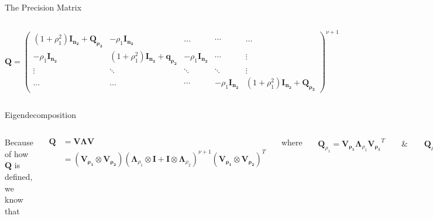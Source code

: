 \documentclass[
  ignorenonframetext,
]{beamer}
\providecommand{\tightlist}{%
  \setlength{\itemsep}{0pt}\setlength{\parskip}{0pt}}\usepackage{longtable,booktabs,array}
\begin{document}
\begin{frame}{The Precision Matrix}
\begin{columns}[T]
\[
\mathbf Q = \begin{pmatrix}
(1+\rho_1^2)\mathbf{I_{n_2}} + \mathbf{Q_{\rho_2}} & -\rho_1\mathbf{I_{n_2}} & \dots & \cdots & \dots \\
-\rho_1\mathbf{I_{n_2}} & (1+\rho_1^2)\mathbf{I_{n_2}} + \mathbf{q_{\rho_2}} & -\rho_1 \mathbf{I_{n_2}} & \cdots & \vdots  \\
\vdots & \ddots & \ddots & \ddots & \vdots \\
\dots & \dots & \cdots & -\rho_1 \mathbf{I_{n_2}} & (1+\rho_1^2)\mathbf{I_{n_2}} + \mathbf{Q_{\rho_2}}
\end{pmatrix}^{\nu + 1}
\]
\end{columns}
\end{frame}

\begin{frame}{Eigendecomposition}
\label{eigendecomposition}
\begin{columns}[T]
Because of how \(\mathbf{Q}\) is defined, we know that

\[
\begin{aligned}
\mathbf{Q} &= \mathbf{V}\boldsymbol{\Lambda}\mathbf{V} \\
&= (\mathbf{V_{\rho_1}} \otimes \mathbf{V_{\rho_2}})(\boldsymbol \Lambda_{\rho_1} \otimes \mathbf{I} + \mathbf{I} \otimes \boldsymbol \Lambda_{\rho_2})^{\nu + 1}(\mathbf{V_{\rho_1}} \otimes \mathbf{V_{\rho_2}})^T
\end{aligned}
\]

where

\[
\begin{aligned}
\mathbf{Q}_{\rho_1} = \mathbf{V_{\rho_1}}\boldsymbol \Lambda_{\rho_1}\mathbf{V_{\rho_1}}^T \qquad \& \qquad
\mathbf{Q}_{\rho_2} = \mathbf{V_{\rho_2}}\boldsymbol \Lambda_{\rho_2}\mathbf{V_{\rho_2}}^T
\end{aligned}
\]

Spectral decomposition defined by value/vector pairs of smaller matrices

\begin{column}{0.5\textwidth}
\[
\left\{\lambda_{\rho_1}\right\}_i + \left\{\lambda_{\rho_2}\right\}_j
\]
\end{column}

\begin{column}{0.48\textwidth}
\[
\left\{\mathbf{v}_{\rho_1}\right\}_i \otimes \left\{\mathbf{v}_{\rho_2}\right\}_j
\]
\end{column}

\begin{itemize}
\tightlist
\item
  Problem:
  \(\boldsymbol \Sigma_{ii} = \left(\mathbf Q^{-1} \right)_{ii} \neq  1\)
\item
  Solution: \(\mathbf{\widetilde  Q} = \mathbf{D}\mathbf{Q}\mathbf{D}\),
  where \(\mathbf D_{ii} = \sqrt{\boldsymbol \Sigma_{ii}}\)
\end{itemize}
\end{columns}
\end{frame}
\end{document}
